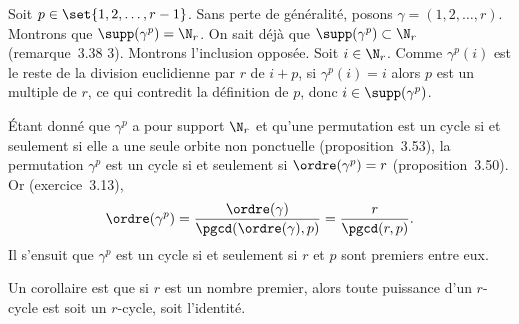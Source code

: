 
Soit $p\in\set{1, 2, \dots, r - 1}$.
Sans perte de généralité, posons $\gamma = (1, 2, \dots, r)$.
Montrons que $\supp(\gamma^p) = \N_r$.
On sait déjà que $\supp(\gamma^p) \subset \N_r$ (remarque~3.38 3).
Montrons l'inclusion opposée.
Soit $i\in\N_r$.
Comme $\gamma^p(i)$ est le reste de la division euclidienne par $r$ de $i + p$, si $\gamma^p(i) = i$ alors $p$ est un multiple de $r$, ce qui contredit la définition de $p$, donc $i\in\supp(\gamma^p)$.

Étant donné que $\gamma^p$ a pour support $\N_r$ et qu'une permutation est un cycle si et seulement si elle a une seule orbite non ponctuelle (proposition~3.53), la permutation $\gamma^p$ est un cycle si et seulement si $\ordre(\gamma^p) = r$ (proposition~3.50).
Or (exercice~3.13),
\[
  \ordre(\gamma^p) = \frac{\ordre(\gamma)}{\pgcd(\ordre(\gamma), p)} = \frac{r}{\pgcd(r, p)}.
\]
Il s'ensuit que $\gamma^p$ est un cycle si et seulement si $r$ et $p$ sont premiers entre eux.

\begin{remarque}
  Un corollaire est que si $r$ est un nombre premier, alors toute puissance d'un $r$-cycle est soit un $r$-cycle, soit l'identité.
\end{remarque}
